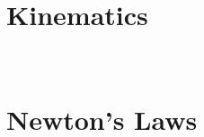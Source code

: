 \documentclass[english,twoside]{labmanual} %
\begin{document}


\tableofcontents{}

\part{Kinematics}
\














\part{Newton's Laws}
\










\end{document}
